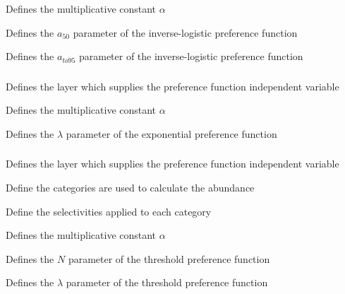  {Defines the multiplicative constant $\alpha$}

 {Defines the $a_{50}$ parameter of the inverse-logistic preference function}

 {Defines the $a_{to95}$ parameter of the inverse-logistic preference function}

\subsubsection[Exponential]{}

 {Defines the layer which supplies the preference function independent variable}

 {Defines the multiplicative constant $\alpha$}

 {Defines the $\lambda$ parameter of the exponential preference function}

\subsubsection[Threshold]{}

 {Defines the layer which supplies the preference function independent variable}

 {Define the categories are used to calculate the abundance}

 {Define the selectivities applied to each category}

 {Defines the multiplicative constant $\alpha$}

 {Defines the $N$ parameter of the threshold preference function}

 {Defines the $\lambda$ parameter of the threshold preference function}

